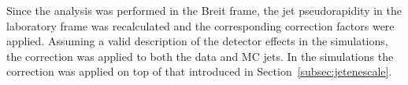 Since the analysis was performed in the Breit frame, the jet pseudorapidity in the laboratory frame was recalculated and the corresponding correction factors were applied. Assuming a valid description of the detector effects in the simulations, the correction was applied to both the data and MC jets. In the simulations the correction was applied on top of that introduced in Section~\ref{subsec:jetenescale}.
